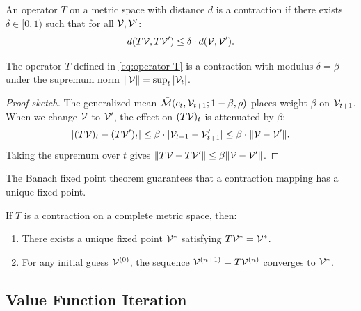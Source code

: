 \begin{definition}
\label{def:contraction}
An operator $T$ on a metric space with distance $d$ is a contraction if there exists $\delta \in [0, 1)$ such that for all $\mathcal{V}, \mathcal{V}'$:
\begin{equation}
d(T\mathcal{V}, T\mathcal{V}') \leq \delta \cdot d(\mathcal{V}, \mathcal{V}').
\label{eq:contraction-def}
\end{equation}
\end{definition}

\begin{proposition}
\label{prop:contraction}
The operator $T$ defined in \cref{eq:operator-T} is a contraction with modulus $\delta = \beta$ under the supremum norm $\|\mathcal{V}\| = \sup_t |\mathcal{V}_t|$.
\end{proposition}

\begin{proof}[Proof sketch]
The generalized mean $\bar{\mathcal{M}}(c_t, \mathcal{V}_{t+1}; 1-\beta, \rho)$ places weight $\beta$ on $\mathcal{V}_{t+1}$. When we change $\mathcal{V}$ to $\mathcal{V}'$, the effect on $(T\mathcal{V})_t$ is attenuated by $\beta$:
\begin{equation}
|(T\mathcal{V})_t - (T\mathcal{V}')_t| \leq \beta \cdot |\mathcal{V}_{t+1} - \mathcal{V}'_{t+1}| \leq \beta \cdot \|\mathcal{V} - \mathcal{V}'\|.
\end{equation}
Taking the supremum over $t$ gives $\|T\mathcal{V} - T\mathcal{V}'\| \leq \beta \|\mathcal{V} - \mathcal{V}'\|$.
\end{proof}

The Banach fixed point theorem guarantees that a contraction mapping has a unique fixed point.

\begin{theorem}
\label{thm:banach}
If $T$ is a contraction on a complete metric space, then:
\begin{enumerate}[label=(\roman*), leftmargin=2em]
    \item There exists a unique fixed point $\mathcal{V}^*$ satisfying $T\mathcal{V}^* = \mathcal{V}^*$.
    \item For any initial guess $\mathcal{V}^{(0)}$, the sequence $\mathcal{V}^{(n+1)} = T\mathcal{V}^{(n)}$ converges to $\mathcal{V}^*$.
\end{enumerate}
\end{theorem}

\subsection{Value Function Iteration}
\label{subsec:vfi}


